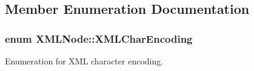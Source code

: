 \subsection{Member Enumeration Documentation}
\hypertarget{structXMLNode_a81bcd09f9c752b65633c1ca28ea025f2}{
\subsubsection[{X\-M\-L\-Char\-Encoding}]{\setlength{\rightskip}{0pt plus 5cm}enum X\-M\-L\-Node\-::\-X\-M\-L\-Char\-Encoding}}\label{structXMLNode_a81bcd09f9c752b65633c1ca28ea025f2}


Enumeration for X\-M\-L character encoding. 

